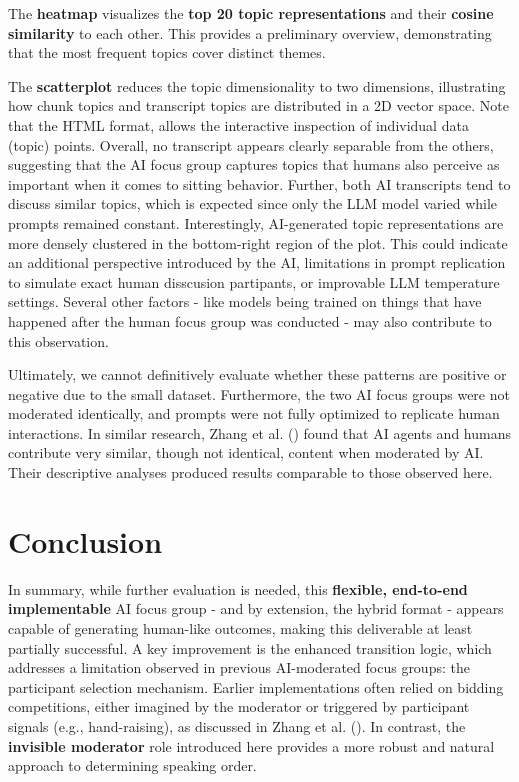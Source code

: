 \documentclass[
  letterpaper,
  DIV=11,
  numbers=noendperiod]{scrartcl}
\begin{document}
The \textbf{heatmap} visualizes the \textbf{top 20 topic
representations} and their \textbf{cosine similarity} to each other.
This provides a preliminary overview, demonstrating that the most
frequent topics cover distinct themes.

The \textbf{scatterplot} reduces the topic dimensionality to two
dimensions, illustrating how chunk topics and transcript topics are
distributed in a 2D vector space. Note that the HTML format, allows the
interactive inspection of individual data (topic) points. Overall, no
transcript appears clearly separable from the others, suggesting that
the AI focus group captures topics that humans also perceive as
important when it comes to sitting behavior. Further, both AI
transcripts tend to discuss similar topics, which is expected since only
the LLM model varied while prompts remained constant. Interestingly,
AI-generated topic representations are more densely clustered in the
bottom-right region of the plot. This could indicate an additional
perspective introduced by the AI, limitations in prompt replication to
simulate exact human disscusion partipants, or improvable LLM
temperature settings. Several other factors - like models being trained
on things that have happened after the human focus group was conducted -
may also contribute to this observation.

Ultimately, we cannot definitively evaluate whether these patterns are
positive or negative due to the small dataset. Furthermore, the two AI
focus groups were not moderated identically, and prompts were not fully
optimized to replicate human interactions. In similar research, Zhang et
al. () found that AI
agents and humans contribute very similar, though not identical, content
when moderated by AI. Their descriptive analyses produced results
comparable to those observed here.

\section{Conclusion}\label{sec-discussion}

In summary, while further evaluation is needed, this \textbf{flexible,
end-to-end implementable} AI focus group - and by extension, the hybrid
format - appears capable of generating human-like outcomes, making this
deliverable at least partially successful. A key improvement is the
enhanced transition logic, which addresses a limitation observed in
previous AI-moderated focus groups: the participant selection mechanism.
Earlier implementations often relied on bidding competitions, either
imagined by the moderator or triggered by participant signals (e.g.,
hand-raising), as discussed in Zhang et al.
(). In contrast, the
\textbf{invisible moderator} role introduced here provides a more robust
and natural approach to determining speaking order.
\end{document}
